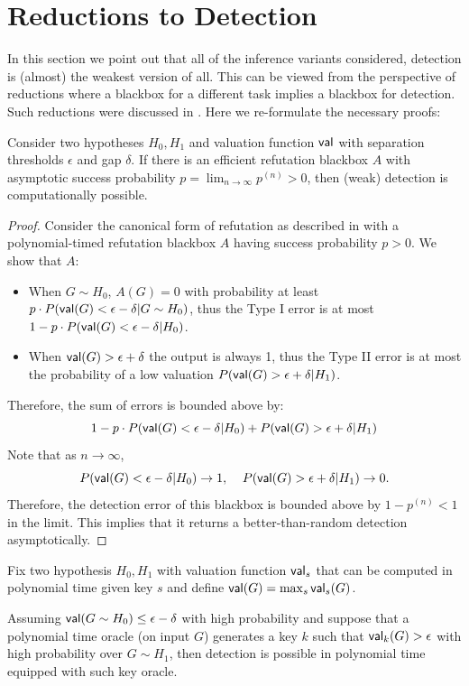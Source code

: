 \documentclass[final,12pt]{colt2023} %
\newcommand\1[1]{\mathbb{I}_{\left\{#1\right\}}}
\begin{document}
\section{Reductions to Detection}\label{reducs}
In this section we point out that all of the inference variants considered, detection is (almost) the weakest version of all. This can be viewed from the perspective of reductions where a blackbox for a different task implies a blackbox for detection. Such reductions were discussed in 
\cite{HWX15,BHK16,BBK,BBH18}. Here we re-formulate the necessary proofs:

\begin{lemma}\label{refutetodetect}
Consider two hypotheses $H_0, H_1$ and valuation function $\mathsf{val}$ with separation thresholds $\epsilon$ and gap $\delta$. If there is an efficient refutation blackbox $A$ with asymptotic success probability $p=\lim_{n\to\infty}p^{(n)}>0$, then (weak) detection is computationally possible.
\end{lemma}
\begin{proof}
Consider the canonical form of refutation as described in  with a polynomial-timed refutation blackbox $A$ having success probability $p>0$. We show that $A$:\begin{itemize}
    \item When $G\sim H_0$, $A(G)=0$ with probability at least $p\cdot P(\mathsf{val}(G)<\epsilon-\delta|G\sim H_0)$, thus the Type I error is at most $1-p\cdot P(\mathsf{val}(G)<\epsilon-\delta|H_0)$.
    \item When $\mathsf{val}(G)>\epsilon+\delta$ the output is always 1, thus the Type II error is at most the probability of a low valuation $P(\mathsf{val}(G)>\epsilon+\delta|H_1)$.
\end{itemize}
Therefore, the sum of errors is bounded above by:
$$1-p\cdot P(\mathsf{val}(G)<\epsilon-\delta|H_0)+P(\mathsf{val}(G)>\epsilon+\delta|H_1)$$
Note that as $n\to\infty$,
$$P(\mathsf{val}(G)<\epsilon-\delta| H_0)\to 1, \;\;\;\;P(\mathsf{val}(G)>\epsilon+\delta|H_1)\to 0.$$
Therefore, the detection error of this blackbox is bounded above by $1-p^{(n)}<1$ in the limit. This implies that it returns a better-than-random detection asymptotically.
\end{proof}
\begin{lemma}\label{recovtodetect}
Fix two hypothesis $H_0, H_1$ with valuation function $\mathsf{val}_s$ that can be computed in polynomial time given key $s$ and define $\mathsf{val}(G)=\max_s\mathsf{val}_{s}(G)$. 

Assuming $\mathsf{val}(G\sim H_0)\leq \epsilon-\delta$ with high probability and suppose that a polynomial time oracle (on input $G$) generates a key $k$ such that $\mathsf{val}_k(G)> \epsilon$ with high probability over $G\sim H_1$, then detection is possible in polynomial time equipped with such key oracle.
\end{lemma}
\end{document}
